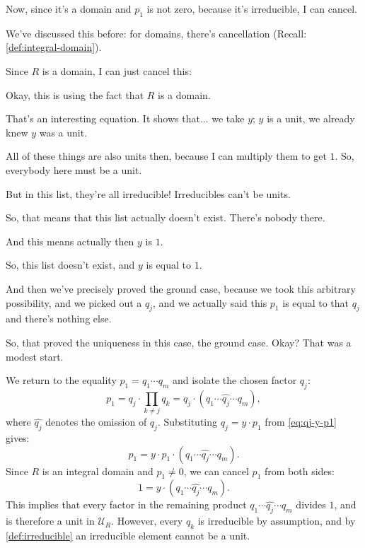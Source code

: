 \begin{proofWrapper}
\begin{speech}[00:39:17 - 00:41:44]
Now, since it's a domain and $p_1$ is not zero, because it's irreducible, I can cancel.

We've discussed this before: for domains, there's cancellation (Recall: \cref{def:integral-domain}).

Since $R$ is a domain, I can just cancel this: 

Okay, this is using the fact that $R$ is a domain. 

That's an interesting equation. It shows that... we take $y$; $y$ is a unit, we already knew $y$ was a unit.

All of these things are also units then, because I can multiply them to get $1$. So, everybody here must be a unit. 

But in this list, they're all irreducible! Irreducibles can't be units.

So, that means that this list actually doesn't exist. There's nobody there.

And this means actually then $y$ is $1$.

So, this list doesn't exist, and $y$ is equal to $1$. 

And then we've precisely proved the ground case, because we took this arbitrary possibility, and we picked out a $q_j$, and we actually said this $p_1$ is equal to that $q_j$ and there's nothing else. 

So, that proved the uniqueness in this case, the ground case. Okay? That was a modest start.
\end{speech}

\begin{content}
We return to the equality $p_1 = q_1 \cdots q_m$ and isolate the chosen factor $q_j$:
\begin{equation}\label{eq:base-case-isolation}
p_1 = q_j \cdot \prod_{k \neq j} q_k = q_j \cdot (q_1 \cdots \widehat{q_j} \cdots q_m),
\end{equation}
where $\widehat{q_j}$ denotes the omission of $q_j$. Substituting $q_j = y \cdot p_1$ from \eqref{eq:qj-y-p1} gives:
\begin{equation}\label{eq:base-case-subst}
p_1 = y \cdot p_1 \cdot (q_1 \cdots \widehat{q_j} \cdots q_m).
\end{equation}
Since $R$ is an integral domain and $p_1 \neq 0$, we can cancel $p_1$ from both sides:
\begin{equation}\label{eq:base-case-canceled}
1 = y \cdot (q_1 \cdots \widehat{q_j} \cdots q_m).
\end{equation}
This implies that every factor in the remaining product $q_1 \cdots \widehat{q_j} \cdots q_m$ divides $1$, and is therefore a unit in $\mathcal{U}_R$. However, every $q_k$ is irreducible by assumption, and by \cref{def:irreducible} an irreducible element cannot be a unit.


\end{content}
\end{proofWrapper}
